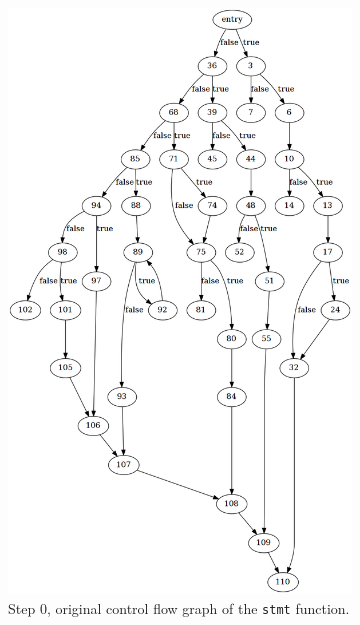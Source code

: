 \begin{figure}[htbp]
	\centering
	\begin{subfigure}[t]{0.45\textwidth}
		\includegraphics[width=\textwidth]{appendices/stmt_example/stmt_0.png}
		\caption{Step 0, original control flow graph of the \texttt{stmt} function.}
	\end{subfigure}
	\qquad
	\begin{subfigure}[t]{0.45\textwidth}

\end{subfigure}
\end{figure}
